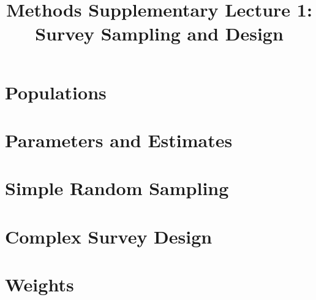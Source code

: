 
\usepackage{tikz}
\usetikzlibrary{shapes,arrows}

\title{Methods Supplementary Lecture 1:\\Survey Sampling and Design}

\date[]{}



\frame{\titlepage}

\frame{\tableofcontents}

\section{Populations}
\frame{\tableofcontents[currentsection]}

\frame{\frametitle{}}


\section{Parameters and Estimates}
\frame{\tableofcontents[currentsection]}

\frame{\frametitle{}}



\section{Simple Random Sampling}
\frame{\tableofcontents[currentsection]}

\frame{\frametitle{}}


\section{Complex Survey Design}
\frame{\tableofcontents[currentsection]}

\frame{\frametitle{}}


\section{Weights}
\frame{\tableofcontents[currentsection]}

\frame{\frametitle{}}




\appendix
\frame{}


